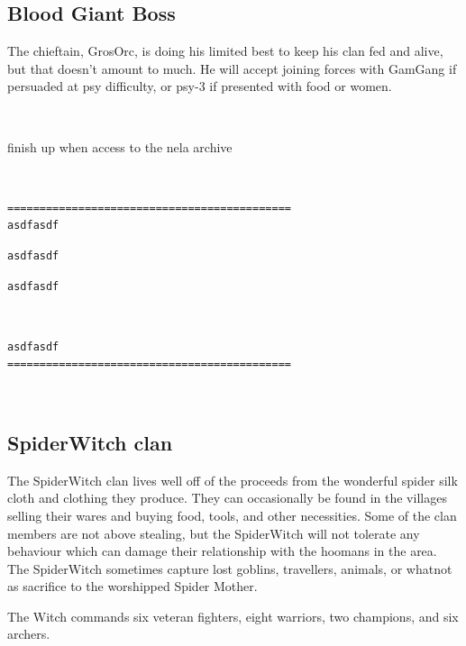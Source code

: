\goodbreak
\subsection*{Blood Giant Boss}

The chieftain, GrosOrc, is doing his limited best to keep his clan fed and alive, but that doesn't amount to much. He will accept joining forces with GamGang if persuaded at psy difficulty, or psy-3 if presented with food or women.

\

\todo finish up when access to the nela archive

\

\small \begin{samepage} \begin{verbatim}
============================================
asdfasdf
\end{verbatim} \end{samepage} \begin{samepage} \begin{verbatim}
asdfasdf
\end{verbatim} \goodbreak \begin{verbatim}
asdfasdf
\end{verbatim} \end{samepage}   \   \goodbreak \begin{samepage} \begin{verbatim}
asdfasdf
============================================
\end{verbatim} \end{samepage} \normalsize

\




\subsection*{SpiderWitch clan}

The SpiderWitch clan lives well off of the proceeds from the wonderful spider silk cloth and clothing they produce. They can occasionally be found in the villages selling their wares and buying food, tools, and other necessities. Some of the clan members are not above stealing, but the SpiderWitch will not tolerate any behaviour which can damage their relationship with the hoomans in the area. The SpiderWitch sometimes capture lost goblins, travellers, animals, or whatnot as sacrifice to the worshipped Spider Mother.

The Witch commands six veteran fighters, eight warriors, two champions, and six archers.


